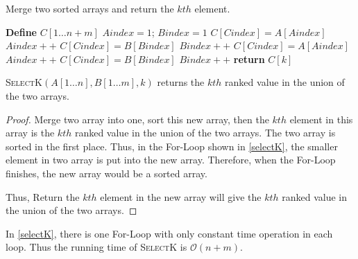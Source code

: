 \begin{homeworkProblem}

\begin{algorithm}[H]
    \caption{Merge two sorted arrays and return the $kth$ element.} \label{selectK}
    \begin{algorithmic}[1]
        \State \textbf{Define } $C[1\ldots n+m]$
        \State$Aindex = 1$; $Bindex = 1$
             
                \State $C[Cindex]= A[Aindex]$
                \State $Aindex++$
             
                \State $C[Cindex] = B[Bindex]$
                \State $Bindex++$
             
                \State $C[Cindex] = A[Aindex]$
                \State $Aindex++$
            \Else {}
                \State $C[Cindex] = B[Bindex]$
                \State $Bindex++$
            \EndIf
        \EndFor
        \State \textbf{return } $C[k]$
        \EndProcedure
    \end{algorithmic}
\end{algorithm}

\Claim \textsc{SelectK}$(A[1\ldots n], B[1\ldots m], k)$ returns the $kth$
ranked value in the union of the two arrays.

\begin{proof}
    Merge two array into one, sort this new array, then the $kth$ element
    in this array is the $kth$ ranked value in the union of the two arrays.
    The two array is sorted in the first place. Thus, in the For-Loop
    shown in \cref{selectK}, the smaller element in two array is put into
    the new array. Therefore, when the For-Loop finishes, the new array
    would be a sorted array.

    Thus, Return the $kth$ element in the new array will give the $kth$ ranked value
    in the union of the two arrays.
\end{proof}

In \cref{selectK}, there is one For-Loop with only constant time operation in each loop.
Thus the running time of \textsc{SelectK} is $\mathcal{O}(n+m)$.

\end{homeworkProblem}
